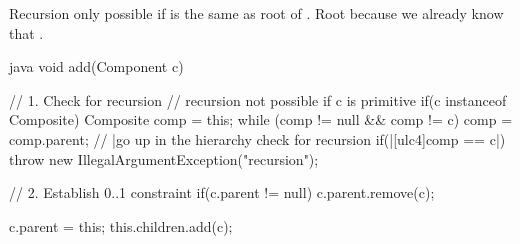 \begin{notebox}[Note]\nospacing
  Recursion only possible if  is the same as
  root of . Root because we already know that
  .
\end{notebox}
\begin{codeboxNl}[Variant 2]{java}
void add(Component c) {
  // 1. Check for recursion
  // recursion not possible if c is primitive
  if(c instanceof Composite) {
    Composite comp = this;
    while (comp != null && comp != c) { comp = comp.parent; }
    // |go up in the hierarchy check for recursion
      if(|\ul[ulc4]{comp == c}|) {
        throw new IllegalArgumentException("recursion");
      }
    }

  // 2. Establish 0..1 constraint
  if(c.parent != null) {
    c.parent.remove(c);
  }

  c.parent = this;
  this.children.add(c);
}
\end{codeboxNl}
